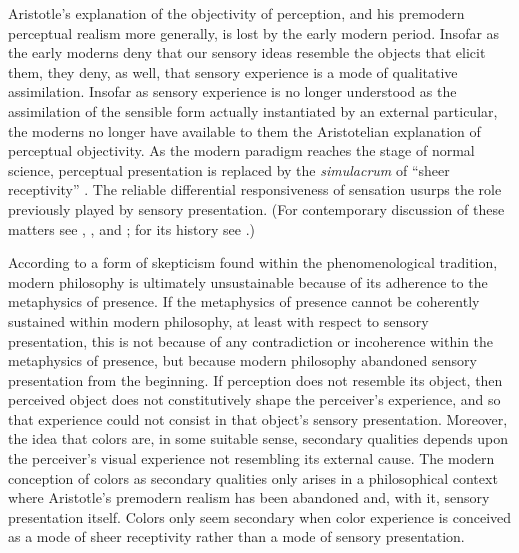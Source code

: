 Aristotle's explanation of the objectivity of perception, and his premodern perceptual realism more generally, is lost by the early modern period. Insofar as the early moderns deny that our sensory ideas resemble the objects that elicit them, they deny, as well, that sensory experience is a mode of qualitative assimilation. Insofar as sensory experience is no longer understood as the assimilation of the sensible form actually instantiated by an external particular, the moderns no longer have available to them the Aristotelian explanation of perceptual objectivity. As the modern paradigm reaches the stage of normal science, perceptual presentation is replaced by the \emph{simulacrum} of ``sheer receptivity'' \citep[16]{Sellars:1967uq}. The reliable differential responsiveness of sensation usurps the role previously played by sensory presentation. (For contemporary discussion of these matters see \citealt{McDowell:1998vn}, \citealt{Putnam:1994kx}, and \citealt{Kalderon:2011fk}; for its history see \citealt{Hamlyn:1961ys}.)

According to a form of skepticism found within the phenomenological tradition, modern philosophy is ultimately unsustainable because of its adherence to the metaphysics of presence. If the metaphysics of presence cannot be coherently sustained within modern philosophy, at least with respect to sensory presentation, this is not because of any contradiction or incoherence within the metaphysics of presence, but because modern philosophy abandoned sensory presentation from the beginning. If perception does not resemble its object, then perceived object does not constitutively shape the perceiver's experience, and so that experience could not consist in that object's sensory presentation. Moreover, the idea that colors are, in some suitable sense, secondary qualities depends upon the perceiver's visual experience not resembling its external cause. The modern conception of colors as secondary qualities only arises in a philosophical context where Aristotle's premodern realism has been abandoned and, with it, sensory presentation itself. Colors only seem secondary when color experience is conceived as a mode of sheer receptivity rather than a mode of sensory presentation.

